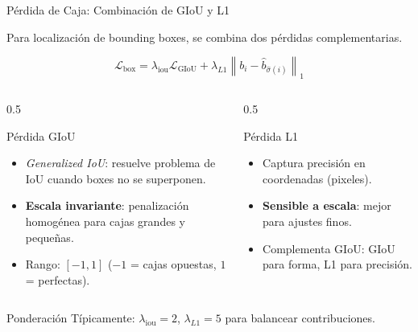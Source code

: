 \documentclass[aspectratio=169, 10pt]{beamer}
\begin{document}
\begin{frame}[shrink]{P\'erdida de Caja: Combinaci\'on de GIoU y L1}

	Para localizaci\'on de bounding boxes, se combina dos p\'erdidas complementarias.

	\vspace{0.2cm}

	{\small
	\[
	\mathcal{L}_{\text{box}} = \lambda_{\text{iou}} \mathcal{L}_{\text{GIoU}} + \lambda_{L1} \left\| b_i - \hat{b}_{\hat{\sigma}(i)} \right\|_1
	\]
	}

	\vspace{0.2cm}

	\begin{columns}[T]
		\begin{column}{0.5\textwidth}
			\begin{block}{P\'erdida GIoU}
				\small
				\begin{itemize}
					\item \textit{Generalized IoU}: resuelve problema de IoU cuando boxes no se superponen.
					\item \textbf{Escala invariante}: penalizaci\'on homog\'enea para cajas grandes y peque\~nas.
					\item Rango: $[-1, 1]$ ($-1$ = cajas opuestas, $1$ = perfectas).
				\end{itemize}
			\end{block}
		\end{column}

		\begin{column}{0.5\textwidth}
			\begin{block}{P\'erdida L1}
				\small
				\begin{itemize}
					\item Captura precisi\'on en coordenadas (pixeles).
					\item \textbf{Sensible a escala}: mejor para ajustes finos.
					\item Complementa GIoU: GIoU para forma, L1 para precisi\'on.
				\end{itemize}
			\end{block}
		\end{column}
	\end{columns}

	\vspace{0.2cm}

	\begin{block}{Ponderaci\'on}
		T\'ipicamente: $\lambda_{\text{iou}} = 2$, $\lambda_{L1} = 5$ para balancear contribuciones.
	\end{block}

\end{frame}
\end{document}
